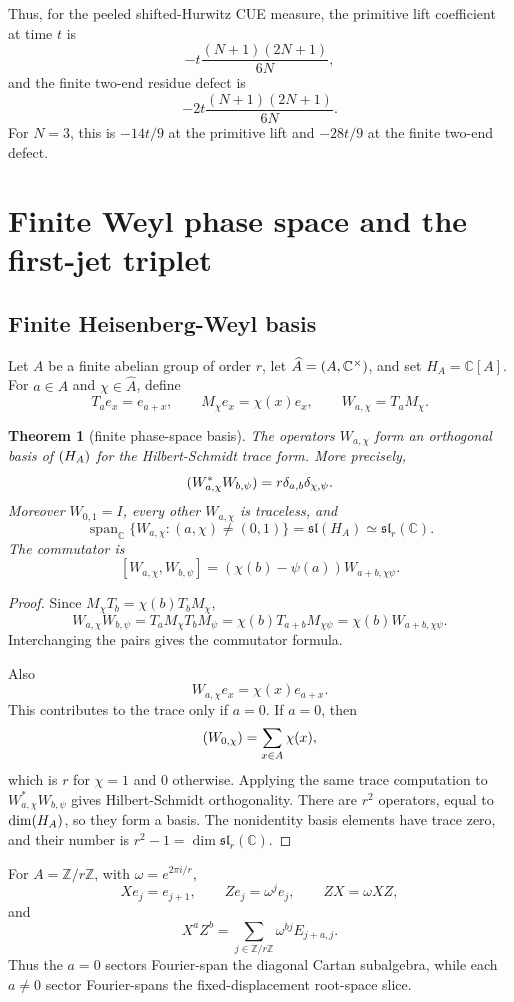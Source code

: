 \documentclass[11pt]{article}
\newtheorem{theorem}{Theorem}[section]
\let\Tr\relax
\let\End\relax
\let\Hom\relax
\DeclareMathOperator{\Tr}{Tr}
\DeclareMathOperator{\End}{End}
\DeclareMathOperator{\Hom}{Hom}
\newcommand{\C}{\mathbb C}
\newcommand{\Z}{\mathbb Z}
\newcommand{\Span}{\operatorname{span}}
\begin{document}
Thus, for the peeled shifted-Hurwitz CUE measure, the primitive lift coefficient at
time $t$ is
\[
-t\frac{(N+1)(2N+1)}{6N},
\]
and the finite two-end residue defect is
\[
-2t\frac{(N+1)(2N+1)}{6N}.
\]
For $N=3$, this is $-14t/9$ at the primitive lift and $-28t/9$ at the finite two-end
defect.

\section{Finite Weyl phase space and the first-jet triplet}

\subsection{Finite Heisenberg-Weyl basis}

Let $A$ be a finite abelian group of order $r$, let $\widehat A=\Hom(A,\C^\times)$,
and set $H_A=\C[A]$.  For $a\in A$ and $\chi\in\widehat A$, define
\[
T_a e_x=e_{a+x},
\qquad
M_\chi e_x=\chi(x)e_x,
\qquad
W_{a,\chi}=T_aM_\chi.
\]

\begin{theorem}[finite phase-space basis]
The operators $W_{a,\chi}$ form an orthogonal basis of $\End(H_A)$ for the
Hilbert-Schmidt trace form.  More precisely,
\[
\Tr(W_{a,\chi}^*W_{b,\psi})=r\delta_{a,b}\delta_{\chi,\psi}.
\]
Moreover $W_{0,1}=I$, every other $W_{a,\chi}$ is traceless, and
\[
\Span_\C\{W_{a,\chi}:(a,\chi)\ne(0,1)\}=\mathfrak{sl}(H_A)\simeq\mathfrak{sl}_r(\C).
\]
The commutator is
\[
[W_{a,\chi},W_{b,\psi}]=(\chi(b)-\psi(a))W_{a+b,\chi\psi}.
\]
\end{theorem}

\begin{proof}
Since $M_\chi T_b=\chi(b)T_bM_\chi$,
\[
W_{a,\chi}W_{b,\psi}=T_aM_\chi T_bM_\psi=\chi(b)T_{a+b}M_{\chi\psi}
=\chi(b)W_{a+b,\chi\psi}.
\]
Interchanging the pairs gives the commutator formula.

Also
\[
W_{a,\chi}e_x=\chi(x)e_{a+x}.
\]
This contributes to the trace only if $a=0$.  If $a=0$, then
\[
\Tr(W_{0,\chi})=\sum_{x\in A}\chi(x),
\]
which is $r$ for $\chi=1$ and $0$ otherwise.  Applying the same trace computation
to $W_{a,\chi}^*W_{b,\psi}$ gives Hilbert-Schmidt orthogonality.  There are $r^2$
operators, equal to $\dim\End(H_A)$, so they form a basis.  The nonidentity basis
elements have trace zero, and their number is $r^2-1=\dim\mathfrak{sl}_r(\C)$.
\end{proof}

For $A=\Z/r\Z$, with $\omega=e^{2\pi i/r}$,
\[
Xe_j=e_{j+1},\qquad Ze_j=\omega^j e_j,
\qquad ZX=\omega XZ,
\]
and
\[
X^aZ^b=\sum_{j\in\Z/r\Z}\omega^{bj}E_{j+a,j}.
\]
Thus the $a=0$ sectors Fourier-span the diagonal Cartan subalgebra, while each
$a\ne0$ sector Fourier-spans the fixed-displacement root-space slice.
\end{document}
